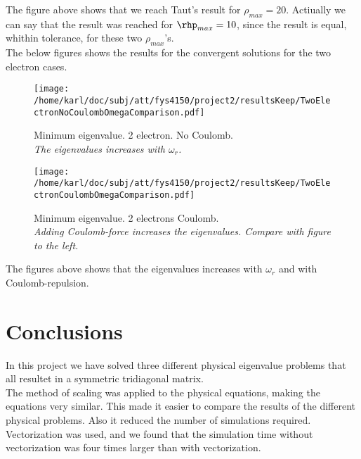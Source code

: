 \documentclass{article}
\begin{document}
The figure above shows that we reach Taut's result for $\rho_{max} = 20$. Actiually we can say that the result was reached for $\rhp_{max} = 10$, since the result is equal, whithin tolerance, for these two $\rho_{max}$'s. \\

The below figures shows the results for the convergent solutions for the two electron cases.

\begin{minipage}{.49\textwidth} %
	\begin{figure}[H]
		\centering
		\texttt{[image: /home/karl/doc/subj/att/fys4150/project2/resultsKeep/TwoElectronNoCoulombOmegaComparison.pdf]}
		\caption{Minimum eigenvalue. 2 electron. No Coulomb. \\
			\textit{The eigenvalues increases with $\omega_r$.}}
		\label{1}
	\end{figure}
\end{minipage}\hfill
\vspace{2ex}
\begin{minipage}{.49\textwidth}
	\begin{figure}[H]
		\centering
		\texttt{[image: /home/karl/doc/subj/att/fys4150/project2/resultsKeep/TwoElectronCoulombOmegaComparison.pdf]}
		\caption{Minimum eigenvalue. 2 electrons  Coulomb.\\
			\textit{Adding Coulomb-force increases the eigenvalues. Compare with figure to the left.}}
		\label{1}
	\end{figure}
\end{minipage}\hfill
\vspace{2ex}

The figures above shows that the eigenvalues increases with $\omega_r$ and with Coulomb-repulsion.


\section{Conclusions}
In this project we have solved three different physical eigenvalue problems that all resultet in a symmetric tridiagonal matrix. \\

The method of scaling was applied to the physical equations, making the equations very similar. This made it easier to compare the results of the different physical problems. Also it reduced the number of simulations required. \\

Vectorization was used, and we found that the simulation time without vectorization was four times larger than with vectorization.\\
\end{document}
